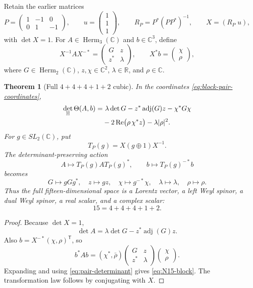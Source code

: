 \documentclass[11pt]{article}
\newtheorem{theorem}{Theorem}[section]
\theoremstyle{definition}
\theoremstyle{remark}
\newcommand{\R}{\mathbb R}
\newcommand{\C}{\mathbb C}
\newcommand{\Hh}{\mathbb H}
\newcommand{\Herm}{\operatorname{Herm}}
\newcommand{\adj}{\operatorname{adj}}
\newcommand{\Ree}{\operatorname{Re}}
\begin{document}
Retain the earlier matrices
\begin{equation}\label{eq:P-data}
 P=\begin{pmatrix}1&-1&0\\0&1&-1\end{pmatrix},
 \qquad u=\begin{pmatrix}1\\1\\1\end{pmatrix},
 \qquad R_P=P^*(PP^*)^{-1},
 \qquad X=(R_P\;u),
\end{equation}
with $\det X=1$.  For $A\in\Herm_3(\C)$ and $b\in\C^3$, define
\begin{equation}\label{eq:block-pair-coordinates}
 X^{-1}AX^{-*}=
 \begin{pmatrix}G&z\\z^*&\lambda\end{pmatrix},
 \qquad
 X^*b=\begin{pmatrix}\chi\\\rho\end{pmatrix},
\end{equation}
where $G\in\Herm_2(\C)$, $z,\chi\in\C^2$, $\lambda\in\R$, and $\rho\in\C$.

\begin{theorem}[Full $4+4+4+1+2$ cubic]\label{thm:full-block-cubic}
In the coordinates \eqref{eq:block-pair-coordinates},
\begin{align}\label{eq:N15-block}
 \det_{\Hh}\Theta(A,b)
 =&\ \lambda\det G-z^*\adj(G)z-\chi^*G\chi\notag\\
 &-2\Ree\bigl(\rho\,\chi^*z\bigr)-\lambda|\rho|^2.
\end{align}
For $g\in SL_2(\C)$, put
\[
 T_P(g)=X(g\oplus1)X^{-1}.
\]
The determinant-preserving action
\begin{equation}\label{eq:structure-action}
 A\mapsto T_P(g)AT_P(g)^*,
 \qquad
 b\mapsto T_P(g)^{-*}b
\end{equation}
becomes
\begin{equation}\label{eq:block-transform-full}
 G\mapsto gGg^*,\quad z\mapsto gz,\quad
 \chi\mapsto g^{-*}\chi,\quad
 \lambda\mapsto\lambda,\quad\rho\mapsto\rho.
\end{equation}
Thus the full fifteen-dimensional space is a Lorentz vector, a left Weyl spinor, a dual Weyl spinor, a real scalar, and a complex scalar:
\[
 15=4+4+4+1+2.
\]
\end{theorem}

\begin{proof}
Because $\det X=1$,
\[
 \det A=\lambda\det G-z^*\adj(G)z.
\]
Also $b=X^{-*}(\chi,\rho)^{\mathsf T}$, so
\[
 b^*Ab=(\chi^*,\bar\rho)
 \begin{pmatrix}G&z\\z^*&\lambda\end{pmatrix}
 \begin{pmatrix}\chi\\\rho\end{pmatrix}.
\]
Expanding and using \eqref{eq:pair-determinant} gives \eqref{eq:N15-block}.  The transformation law follows by conjugating with $X$.
\end{proof}
\end{document}
